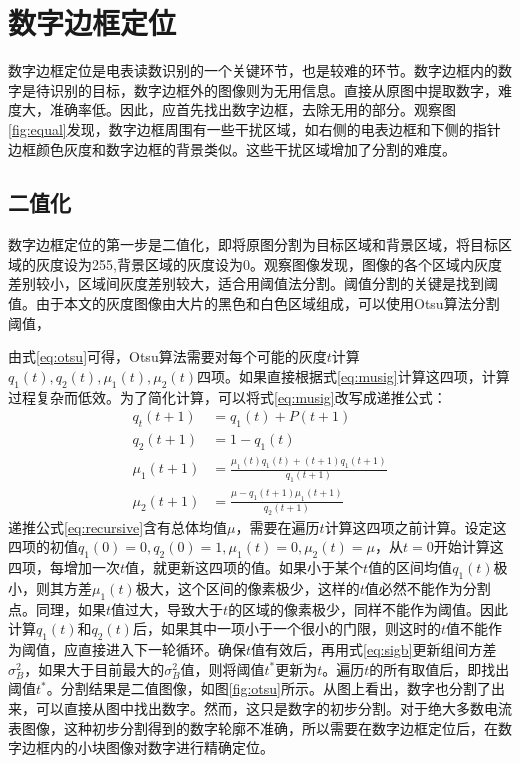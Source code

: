 \section{数字边框定位}

数字边框定位是电表读数识别的一个关键环节，也是较难的环节。数字边框内的数字是待识别的目标，数字边框外的图像则为无用信息。直接从原图中提取数字，难度大，准确率低。因此，应首先找出数字边框，去除无用的部分。观察图\ref{fig:equal}发现，数字边框周围有一些干扰区域，如右侧的电表边框和下侧的指针边框颜色灰度和数字边框的背景类似。这些干扰区域增加了分割的难度。

\subsection{二值化}

数字边框定位的第一步是二值化，即将原图分割为目标区域和背景区域，将目标区域的灰度设为255,背景区域的灰度设为0。观察图像发现，图像的各个区域内灰度差别较小，区域间灰度差别较大，适合用阈值法分割。阈值分割的关键是找到阈值。由于本文的灰度图像由大片的黑色和白色区域组成，可以使用Otsu算法分割阈值，

由式\eqref{eq:otsu}可得，Otsu算法需要对每个可能的灰度$t$计算$q_1(t),q_2(t),\mu_1(t),\mu_2(t)$四项。如果直接根据式\eqref{eq:musig}计算这四项，计算过程复杂而低效。为了简化计算，可以将式\eqref{eq:musig}改写成递推公式：
\begin{equation}
  \label{eq:recursive}
  \begin{aligned}
    q_t(t+1) &=q_1(t)+P(t+1)\\
    q_2(t+1) &=1-q_1(t) \\
    \mu_1(t+1) &=\frac{\mu_1(t)q_1(t)+(t+1)q_1(t+1)}{q_1(t+1)} \\
    \mu_2(t+1) &=\frac{\mu-q_1(t+1)\mu_1(t+1)}{q_2(t+1)}
  \end{aligned}
\end{equation}
递推公式\eqref{eq:recursive}含有总体均值$\mu$，需要在遍历$t$计算这四项之前计算。设定这四项的初值$q_1(0)=0,q_2(0)=1,\mu_1(t)=0,\mu_2(t)=\mu$，从$t=0$开始计算这四项，每增加一次$t$值，就更新这四项的值。如果小于某个$t$值的区间均值$q_1(t)$极小，则其方差$\mu_1(t)$极大，这个区间的像素极少，这样的$t$值必然不能作为分割点。同理，如果$t$值过大，导致大于$t$的区域的像素极少，同样不能作为阈值。因此计算$q_1(t)$和$q_2(t)$后，如果其中一项小于一个很小的门限，则这时的$t$值不能作为阈值，应直接进入下一轮循环。确保$t$值有效后，再用式\eqref{eq:sigb}更新组间方差$\sigma_B^2$，如果大于目前最大的$\sigma_B^2$值，则将阈值$t^{*}$更新为$t$。遍历$t$的所有取值后，即找出阈值$t^{*}$。分割结果是二值图像，如图\ref{fig:otsu}所示。从图上看出，数字也分割了出来，可以直接从图中找出数字。然而，这只是数字的初步分割。对于绝大多数电流表图像，这种初步分割得到的数字轮廓不准确，所以需要在数字边框定位后，在数字边框内的小块图像对数字进行精确定位。

